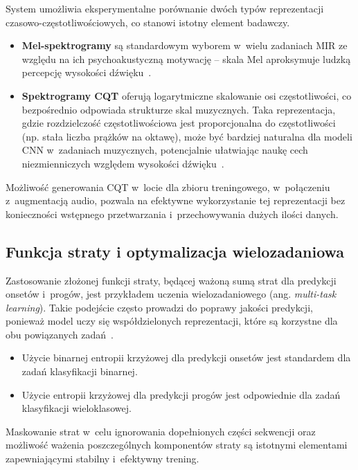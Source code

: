 System umożliwia eksperymentalne porównanie dwóch typów reprezentacji czasowo-częstotliwościowych, co stanowi istotny element badawczy.
\begin{itemize}
    \item \textbf{Mel-spektrogramy} są standardowym wyborem w~wielu zadaniach MIR ze względu na ich psychoakustyczną motywację – skala Mel aproksymuje ludzką percepcję wysokości dźwięku~\autocite{Benetos2019AutomaticMusicTranscription, KlapuriDavy2006SignalProcessing}.
    \item \textbf{Spektrogramy CQT} oferują logarytmiczne skalowanie osi częstotliwości, co bezpośrednio odpowiada strukturze skal muzycznych. Taka reprezentacja, gdzie rozdzielczość częstotliwościowa jest proporcjonalna do częstotliwości (np. stała liczba prążków na oktawę), może być bardziej naturalna dla modeli CNN w~zadaniach muzycznych, potencjalnie ułatwiając naukę cech niezmienniczych względem wysokości dźwięku~\autocite{Wiggins2019TabCNN, Zang2023SynthTab, KlapuriDavy2006SignalProcessing}.
\end{itemize}
Możliwość generowania CQT w~locie dla zbioru treningowego, w~połączeniu z~augmentacją audio, pozwala na efektywne wykorzystanie tej reprezentacji bez konieczności wstępnego przetwarzania i~przechowywania dużych ilości danych.

\subsection{Funkcja straty i optymalizacja wielozadaniowa}
\label{ssec:analiza_loss_teoretyczna_fakt}

Zastosowanie złożonej funkcji straty, będącej ważoną sumą strat dla predykcji onsetów i~progów, jest przykładem uczenia wielozadaniowego (ang. \textit{multi-task learning}). Takie podejście często prowadzi do poprawy jakości predykcji, ponieważ model uczy się współdzielonych reprezentacji, które są korzystne dla obu powiązanych zadań~\autocite{Hawthorne2018Onsets}.
\begin{itemize}
    \item Użycie binarnej entropii krzyżowej dla predykcji onsetów jest standardem dla zadań klasyfikacji binarnej.
    \item Użycie entropii krzyżowej dla predykcji progów jest odpowiednie dla zadań klasyfikacji wieloklasowej.
\end{itemize}
Maskowanie strat w~celu ignorowania dopełnionych części sekwencji oraz możliwość ważenia poszczególnych komponentów straty są istotnymi elementami zapewniającymi stabilny i~efektywny trening.

